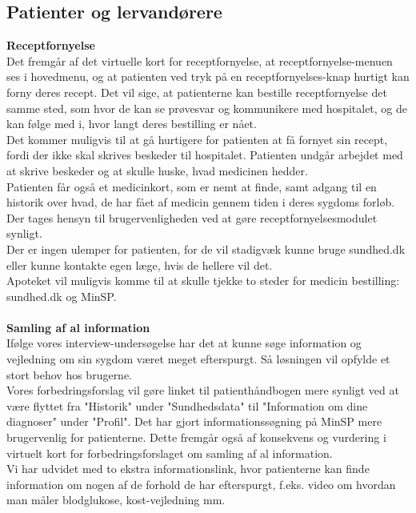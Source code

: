 \subsection{Patienter og lervandørere}
\textbf{Receptfornyelse}\\
Det fremgår af det virtuelle kort for receptfornyelse, at receptfornyelse-menuen ses i hovedmenu, og at patienten ved tryk på en receptfornyelses-knap hurtigt kan forny deres recept. Det vil sige, at patienterne kan bestille receptfornyelse det samme sted, som hvor de kan se prøvesvar og kommunikere med hospitalet, og de kan følge med i, hvor langt deres bestilling er nået.\\
Det kommer muligvis til at gå hurtigere for patienten at få fornyet sin recept, fordi der ikke skal skrives beskeder til hospitalet. Patienten undgår arbejdet med at skrive beskeder og at skulle huske, hvad medicinen hedder.\\
Patienten får også et medicinkort, som er nemt at finde, samt adgang til en historik over hvad, de har fået af medicin gennem tiden i deres sygdoms forløb.\\
Der tages hensyn til brugervenligheden ved at gøre receptfornyelsesmodulet synligt.\\ 
Der er ingen ulemper for patienten, for de vil stadigvæk kunne bruge sundhed.dk eller kunne kontakte egen læge, hvis de hellere vil det.\\
Apoteket vil muligvis komme til at skulle tjekke to steder for medicin bestilling: sundhed.dk og MinSP.
\\\\
\textbf{Samling af al information}\\
Ifølge vores interview-undersøgelse har det at kunne søge information og vejledning om sin sygdom været meget efterspurgt. Så løsningen vil opfylde et stort behov hos brugerne. \\
Vores forbedringsforslag vil gøre linket til patienthåndbogen mere synligt ved at være flyttet fra "Historik" under "Sundhedsdata" til "Information om dine diagnoser" under "Profil". Det har gjort informationssøgning på MinSP mere brugervenlig for patienterne. Dette fremgår også af konsekvens og vurdering i virtuelt kort for forbedringsforslaget om samling af al information.\\
Vi har udvidet med to ekstra informationslink, hvor patienterne kan finde information om nogen af de forhold de har efterspurgt, f.eks. video om hvordan man måler blodglukose, kost-vejledning mm.\\
